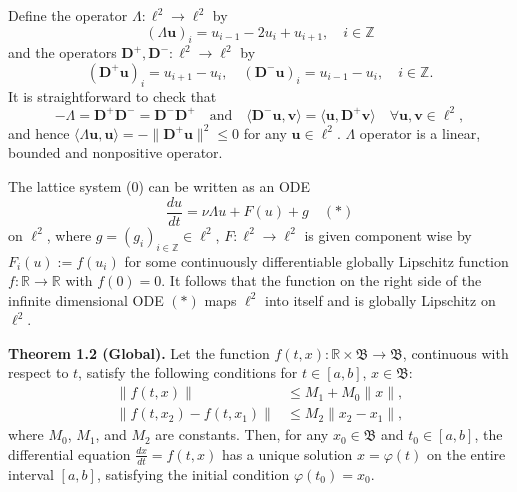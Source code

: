 \documentclass[11pt]{beamer}
\begin{document}
\begin{frame}
    \begin{definition}
        Define the operator $\Lambda : \ell^2 \to \ell^2$ by
        \[
        (\Lambda \mathbf{u})_i = u_{i-1} - 2 u_i + u_{i+1}, \quad i \in \mathbb{Z}
        \]
        and the operators $\mathbf{D}^+, \mathbf{D}^- : \ell^2 \to \ell^2$ by
        \[
        (\mathbf{D}^+ \mathbf{u})_i = u_{i+1} - u_i, \quad (\mathbf{D}^- \mathbf{u})_i = u_{i-1} - u_i, \quad i \in \mathbb{Z}.
        \]
        It is straightforward to check that
        \[
        -\Lambda = \mathbf{D}^+ \mathbf{D}^- = \mathbf{D}^- \mathbf{D}^+ \quad \text{and} \quad \langle \mathbf{D}^- \mathbf{u}, \mathbf{v} \rangle = \langle \mathbf{u}, \mathbf{D}^+ \mathbf{v} \rangle \quad \forall \mathbf{u}, \mathbf{v} \in \ell^2,
        \]
        and hence $\langle \Lambda \mathbf{u}, \mathbf{u} \rangle = - \|\mathbf{D}^+ \mathbf{u}\|^2 \leq 0$ for any $\mathbf{u} \in \ell^2$.
        $\Lambda$ operator is a linear, bounded and nonpositive operator.
    \end{definition}
\end{frame}

\begin{frame}
    The lattice system (0) can be written as an ODE
\[ \frac{du}{dt} = \nu \Lambda u + F(u) + g \quad (*)\]
on $\ell^2$, where $g = (g_i)_{i \in \mathbb{Z}}\in \ell^2 $, $F: \ell^2 \to \ell^2$ is given component wise by $F_i(u) := f(u_i)$ for some continuously differentiable globally Lipschitz function $f: \mathbb{R} \to \mathbb{R}$ with $f(0) = 0$. It follows that the function on the right side of the infinite dimensional ODE \((*)\) maps $\ell^2$ into itself and is globally Lipschitz on $\ell^2$.
\end{frame}

\begin{frame}
\textbf{Theorem 1.2 (Global).} Let the function $f(t, x):\mathbb{R}\times\mathfrak{B}\to\mathfrak{B}$, continuous with respect to $t$, satisfy the following conditions for $t \in [a, b]$, $x \in \mathfrak{B}$:
\begin{align}
\|f(t, x)\| &\leq M_1 + M_0\|x\|,  \\
\|f(t, x_2) - f(t, x_1)\| &\leq M_2\|x_2 - x_1\|, 
\end{align}
where $M_0$, $M_1$, and $M_2$ are constants.
Then, for any $x_0 \in \mathfrak{B}$ and $t_0 \in [a, b]$, the differential equation $\frac{dx}{dt} = f(t, x)$ has a unique solution $x = \varphi(t)$ on the entire interval $[a, b]$, satisfying the initial condition $\varphi(t_0)=x_0$.

\end{frame}
\end{document}
